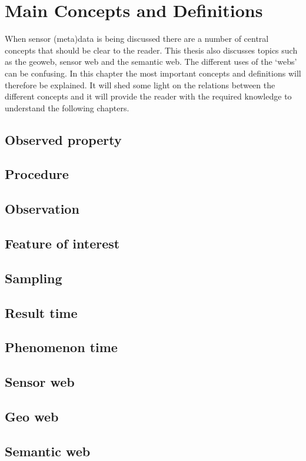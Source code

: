 

\chapter{Main Concepts and Definitions}

When sensor (meta)data is being discussed there are a number of central concepts that should be clear to the reader. This thesis also discusses topics such as the geoweb, sensor web and the semantic web. The different uses of the `webs' can be confusing. In this chapter the most important concepts and definitions will therefore be explained. It will shed some light on the relations between the different concepts and it will provide the reader with the required knowledge to understand the following chapters.  

\section*{Observed property} 

\section*{Procedure}

\section*{Observation} 

\section*{Feature of interest}

\section*{Sampling}

\section*{Result time}

\section*{Phenomenon time}   

\section*{Sensor web}

\section*{Geo web}

\section*{Semantic web}